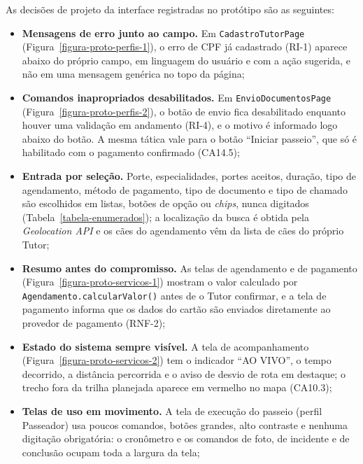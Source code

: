 As decisões de projeto da interface registradas no protótipo são as seguintes:

\begin{sloppypar}
\begin{itemize}
	\item \textbf{Mensagens de erro junto ao campo.} Em \texttt{CadastroTutorPage} (Figura~\ref{figura-proto-perfis-1}), o erro de CPF já cadastrado (RI-1) aparece abaixo do próprio campo, em linguagem do usuário e com a ação sugerida, e não em uma mensagem genérica no topo da página;

	\item \textbf{Comandos inapropriados desabilitados.} Em \texttt{EnvioDocumentosPage} (Figura~\ref{figura-proto-perfis-2}), o botão de envio fica desabilitado enquanto houver uma validação em andamento (RI-4), e o motivo é informado logo abaixo do botão. A mesma tática vale para o botão ``Iniciar passeio'', que só é habilitado com o pagamento confirmado (CA14.5);

	\item \textbf{Entrada por seleção.} Porte, especialidades, portes aceitos, duração, tipo de agendamento, método de pagamento, tipo de documento e tipo de chamado são escolhidos em listas, botões de opção ou \textit{chips}, nunca digitados (Tabela~\ref{tabela-enumerados}); a localização da busca é obtida pela \textit{Geolocation API} e os cães do agendamento vêm da lista de cães do próprio Tutor;

	\item \textbf{Resumo antes do compromisso.} As telas de agendamento e de pagamento (Figura~\ref{figura-proto-servicos-1}) mostram o valor calculado por \texttt{Agendamento.calcularValor()} antes de o Tutor confirmar, e a tela de pagamento informa que os dados do cartão são enviados diretamente ao provedor de pagamento (RNF-2);

	\item \textbf{Estado do sistema sempre visível.} A tela de acompanhamento (Figura~\ref{figura-proto-servicos-2}) tem o indicador ``AO VIVO'', o tempo decorrido, a distância percorrida e o aviso de desvio de rota em destaque; o trecho fora da trilha planejada aparece em vermelho no mapa (CA10.3);

	\item \textbf{Telas de uso em movimento.} A tela de execução do passeio (perfil Passeador) usa poucos comandos, botões grandes, alto contraste e nenhuma digitação obrigatória: o cronômetro e os comandos de foto, de incidente e de conclusão ocupam toda a largura da tela;


\end{itemize}
\end{sloppypar}
